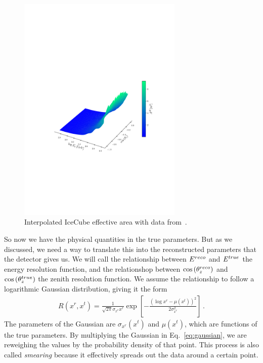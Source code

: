 \begin{figure}[ht]
    \includegraphics[width=0.7\textwidth]{figures/aeff.pdf}
    \caption{Interpolated IceCube effective area with data from~\cite{ICaeff}.}
    \label{fig:aeff}
\end{figure}

So now we have the physical quantities in the true parameters. 
But as we discussed, we need a way to translate this into the reconstructed parameters that the detector gives us. We will call the relationship between 
$E^{reco}$ and $E^{true}$ the energy resolution function, and the relationshop between $\cos{(\theta_z^{reco})}$ and $\cos{(\theta_z^{true})}$ the zenith resolution function. 
We assume the relationship to follow a logarithmic Gaussian distribution, giving it the form 
\begin{align}\label{eq:gaussian}
    R(x^r, x^t) = \frac{1}{\sqrt{2\pi} \sigma_{x^r}x^r} \exp\left[-\frac{(\log x^r-\mu(x^t))^2}{2\sigma_{x^r}^2}\right]\,.
\end{align}
The parameters of the Gaussian are $\sigma_{x^r}(x^t)$ and $\mu(x^t)$, which are functions of the true parameters. By multiplying the Gaussian in Eq.~\ref{eq:gaussian}, we are reweighing the values by the 
probability density of that point. This process is also called \emph{smearing} because it effectively spreads out the data around a certain point. 

